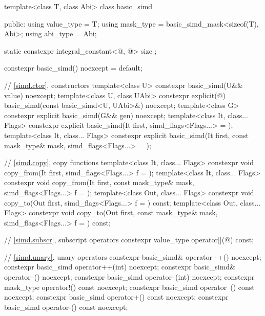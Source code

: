 \begin{codeblock}
template<class T, class Abi> class basic_simd {
public:
  using value_type = T;
  using mask_type = basic_simd_mask<sizeof(T), Abi>;
  using abi_type = Abi;

  static constexpr integral_constant<@\simdsizetype@, @> size {};

  constexpr basic_simd() noexcept = default;

  // \ref{simd.ctor},  constructors
  template<class U> constexpr basic_simd(U&& value) noexcept;
  template<class U, class UAbi>
    constexpr explicit(@\seebelow@) basic_simd(const basic_simd<U, UAbi>&) noexcept;
  template<class G> constexpr explicit basic_simd(G&& gen) noexcept;
  template<class It, class... Flags>
    constexpr explicit basic_simd(It first, simd_flags<Flags...> = {});
  template<class It, class... Flags>
    constexpr explicit basic_simd(It first, const mask_type& mask, simd_flags<Flags...> = {});

  // \ref{simd.copy},  copy functions
  template<class It, class... Flags>
    constexpr void copy_from(It first, simd_flags<Flags...> f = {});
  template<class It, class... Flags>
    constexpr void copy_from(It first, const mask_type& mask, simd_flags<Flags...> f = {});
  template<class Out, class... Flags>
    constexpr void copy_to(Out first, simd_flags<Flags...> f = {}) const;
  template<class Out, class... Flags>
    constexpr void copy_to(Out first, const mask_type& mask, simd_flags<Flags...> f = {}) const;

  // \ref{simd.subscr},  subscript operators
  constexpr value_type operator[](@\simdsizetype@) const;

  // \ref{simd.unary},  unary operators
  constexpr basic_simd& operator++() noexcept;
  constexpr basic_simd operator++(int) noexcept;
  constexpr basic_simd& operator--() noexcept;
  constexpr basic_simd operator--(int) noexcept;
  constexpr mask_type operator!() const noexcept;
  constexpr basic_simd operator~() const noexcept;
  constexpr basic_simd operator+() const noexcept;
  constexpr basic_simd operator-() const noexcept;

}
\end{codeblock}
